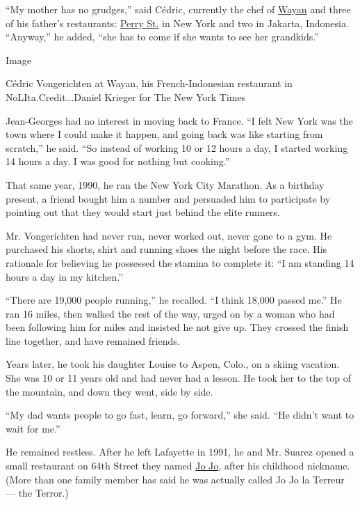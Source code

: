 ``My mother has no grudges,'' said Cédric, currently the chef of
\href{https://www.nytimes.com/2019/04/23/dining/wayan-restaurant-review.html}{Wayan}
and three of his father's restaurants:
\href{https://www.nytimes.com/2005/09/07/dining/reviews/showmanship-yields-to-elegance.html}{Perry
St.} in New York and two in Jakarta, Indonesia. ``Anyway,'' he added,
``she has to come if she wants to see her grandkids.''

Image

Cédric Vongerichten at Wayan, his French-Indonesian restaurant in
NoLIta.Credit...Daniel Krieger for The New York Times

Jean-Georges had no interest in moving back to France. ``I felt New York
was the town where I could make it happen, and going back was like
starting from scratch,'' he said. ``So instead of working 10 or 12 hours
a day, I started working 14 hours a day. I was good for nothing but
cooking.''

That same year, 1990, he ran the New York City Marathon. As a birthday
present, a friend bought him a number and persuaded him to participate
by pointing out that they would start just behind the elite runners.

Mr. Vongerichten had never run, never worked out, never gone to a gym.
He purchased his shorts, shirt and running shoes the night before the
race. His rationale for believing he possessed the stamina to complete
it: ``I am standing 14 hours a day in my kitchen.''

``There are 19,000 people running,'' he recalled. ``I think 18,000
passed me.'' He ran 16 miles, then walked the rest of the way, urged on
by a woman who had been following him for miles and insisted he not give
up. They crossed the finish line together, and have remained friends.

Years later, he took his daughter Louise to Aspen, Colo., on a skiing
vacation. She was 10 or 11 years old and had never had a lesson. He took
her to the top of the mountain, and down they went, side by side.

``My dad wants people to go fast, learn, go forward,'' she said. ``He
didn't want to wait for me.''

He remained restless. After he left Lafayette in 1991, he and Mr. Suarez
opened a small restaurant on 64th Street they named
\href{https://www.jojorestaurantnyc.com/}{Jo Jo}, after his childhood
nickname. (More than one family member has said he was actually called
Jo Jo la Terreur --- the Terror.)

